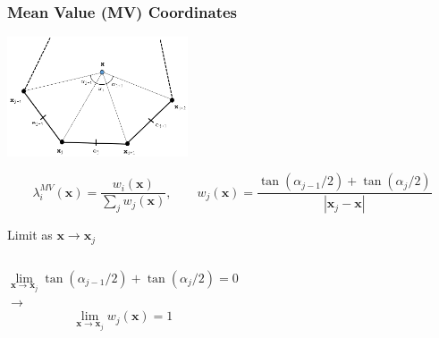 \documentclass[compress,10pt]{beamer}
\renewcommand{\vec}[1]{\mathbf{#1}}
\begin{document}
\begin{frame}[t]\frametitle{Mean Value (MV) Coordinates}
\centering
\includegraphics[width=0.40\textwidth]{images/ref_polygon.png}
\vspace{0.3cm}
\begin{block}{}
\begin{equation*}
\lambda_i^{MV} (\vec{x}) = \frac{w_i (\vec{x}) }{ \sum_{j} w_j (\vec{x})}, \qquad w_j (\vec{x}) = \frac{\tan(\alpha_{j-1} / 2) + \tan(\alpha_j / 2)}{|\vec{x}_j - \vec{x}|}
\end{equation*}
\end{block}
\begin{block}{Limit as $\vec{x} \rightarrow \vec{x}_j$}
\vspace{-0.25cm}
\begin{columns}
\centering
\begin{equation*}
\lim_{\vec{x} \rightarrow \vec{x}_j} \tan(\alpha_{j-1} / 2) + \tan(\alpha_j / 2) = 0
\end{equation*}
\centering
$\longrightarrow$
\centering
\begin{equation*}
\lim_{\vec{x} \rightarrow \vec{x}_j}  w_j (\vec{x}) = 1
\end{equation*}
\end{columns}
\end{block}
\end{frame}
\end{document}
